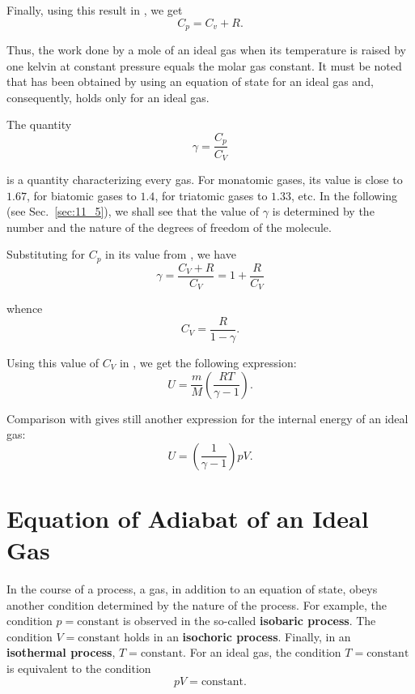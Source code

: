 \noindent
Finally, using this result in , we get
\begin{equation}\label{eq:10_33}
	C_p = C_v + R.
\end{equation}

Thus, the work done by a mole of an ideal gas when its temperature is raised by one kelvin at constant pressure equals the molar gas constant. It must be noted that  has been obtained by using an equation of state for an ideal gas and, consequently, holds only for an ideal gas.

The quantity
\begin{equation}\label{eq:10_34}
	\gamma = \frac{C_p}{C_V}
\end{equation}

\noindent
is a quantity characterizing every gas. For monatomic gases, its value is close to $1.67$, for biatomic gases to $1.4$, for triatomic gases to $1.33$, etc. In the following (see Sec.~\ref{sec:11_5}), we shall see that the value of $\gamma$ is determined by the number and the nature of the degrees of freedom of the molecule.

Substituting for $C_p$ in  its value from , we have
\begin{equation*}
	\gamma = \frac{C_V + R}{C_V} = 1 + \frac{R}{C_V}
\end{equation*}

\noindent
whence
\begin{equation}\label{eq:10_35}
	C_V = \frac{R}{1 - \gamma}.
\end{equation}

\noindent
Using this value of $C_V$ in , we get the following expression:
\begin{equation}\label{eq:10_36}
	U = \frac{m}{M}\left(\frac{RT}{\gamma - 1}\right).
\end{equation}

\noindent
Comparison with  gives still another expression for the internal energy of an ideal gas:
\begin{equation}\label{eq:10_37}
	U = \left(\frac{1}{\gamma - 1}\right) pV.
\end{equation}

\section{Equation of Adiabat of an Ideal Gas}\label{sec:10_10}

In the course of a process, a gas, in addition to an equation of state, obeys another condition determined by the nature of the process. For example, the condition $p=\text{constant}$ is observed in the so-called \textbf{isobaric process}. The condition $V=\text{constant}$ holds in an \textbf{isochoric process}. Finally, in an \textbf{isothermal process}, $T=\text{constant}$. For an ideal gas, the condition $T=\text{constant}$ is equivalent to the condition
\vspace{-12pt}
\begin{equation}\label{eq:10_38}
	pV = \text{constant}.
\end{equation}

